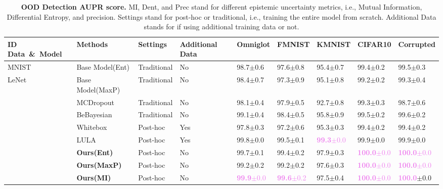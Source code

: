 \begin{table}[h]
  \begin{center}
  \scriptsize
  \caption{\textbf{OOD Detection AUPR score.}  MI, Dent, and Prec stand for different epistemic uncertainty metrics, i.e., Mutual Information, Differential Entropy, and precision. Settings stand for post-hoc or traditional, i.e., training the entire model from scratch. Additional Data stands for if using additional training data or not.}
  \vspace{-1.5em}
  \begin{tabular}{lllllllll}
    \\
    \toprule
    \textbf{ID Data}\ \&\ \textbf{Model} & \textbf{Methods} & \textbf{Settings} & \textbf{Additional Data} & \textbf{Omniglot}& \textbf{FMNIST} & \textbf{KMNIST}& \textbf{CIFAR10} &\textbf{Corrupted}\\
    \hline
    MNIST & Base Model(Ent) & Traditional & No & 98.7$\pm$0.6 & 97.6$\pm$0.8 & 95.4$\pm$0.7 & 99.4$\pm$0.2 & 99.5$\pm$0.3  \\
    LeNet & Base Model(MaxP) & Traditional & No & 98.4$\pm$0.7 & 97.3$\pm$0.9 & 95.1$\pm$0.8 & 99.2$\pm$0.2 & 99.3$\pm$0.4  \\
              & MCDropout & Traditional & No & 98.1$\pm$0.4 & 97.9$\pm$0.5 & 92.7$\pm$0.8 & 99.3$\pm$0.3 & 98.7$\pm$0.6  \\
              & BeBayesian &Traditional & No & 99.1$\pm$0.4 & 98.4$\pm$0.5 & 95.8$\pm$0.9 & 99.5$\pm$0.2 & 99.6$\pm$0.2  \\
              & Whitebox & Post-hoc & Yes & 97.8$\pm$0.3 & 97.2$\pm$0.6 & 95.3$\pm$0.3 & 99.4$\pm$0.2 & 99.4$\pm$0.2  \\
              & LULA & Post-hoc & Yes & 99.8$\pm$0.0 & 99.5$\pm$0.1 & \textcolor{violet}{\textbf{99.3}$\pm$0.0} & 99.9$\pm$0.0 & 99.9$\pm$0.0  \\
    \hline
              & \textbf{Ours(Ent)} & Post-hoc & No & 99.7$\pm$0.1 & 99.4$\pm$0.2 & 97.9$\pm$0.3 &  \textcolor{violet}{\textbf{100.0}$\pm$0.0} & \textcolor{violet}{\textbf{100.0}$\pm$0.0} \\
              & \textbf{Ours(MaxP)} & Post-hoc & No & 99.2$\pm$0.2 & 99.2$\pm$0.2 &97.6$\pm$0.3 &  \textcolor{violet}{\textbf{100.0}$\pm$0.0} & \textcolor{violet}{\textbf{100.0}$\pm$0.0} \\
              & \textbf{Ours(MI)} & Post-hoc & No & \textcolor{violet}{\textbf{99.9}$\pm$0.0} & \textcolor{violet}{\textbf{99.6}$\pm$0.2} & 97.5$\pm$0.4 & \textcolor{violet}{\textbf{100.0}$\pm$0.0} & \textcolor{violet}{\textbf{100.0}}$\pm$0.0 \\

\end{tabular}
\end{center}
\end{table}
